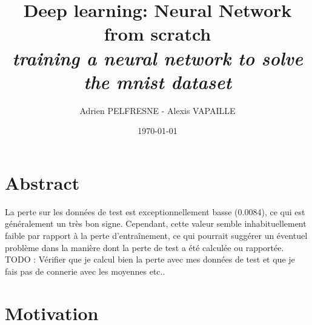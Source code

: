 \documentclass[a4paper, twocolumn, twoside]{article}
\title{Deep learning: Neural Network from scratch\\
\textit{training a neural network to solve the mnist dataset}}
\author{Adrien PELFRESNE - Alexis VAPAILLE}
\date{\today}
\begin{document}
    \maketitle

	\section{Abstract}

	La perte sur les données de test est exceptionnellement basse (0.0084), ce qui est généralement un très bon signe. Cependant, cette valeur semble inhabituellement faible par rapport à la perte d'entraînement, ce qui pourrait suggérer un éventuel problème dans la manière dont la perte de test a été calculée ou rapportée.
	TODO : Vérifier que je calcul bien la perte avec mes données de test et que je fais pas de connerie avec les moyennes etc..

	\section{Motivation}
\end{document}
